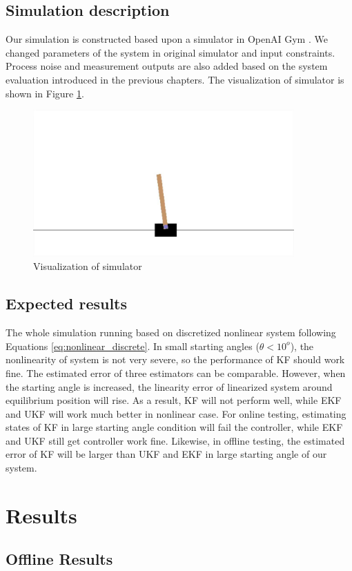 \documentclass{article}
\begin{document}
\subsection{Simulation description}
Our simulation is constructed based upon a simulator in OpenAI Gym \cite{OpenAI}. We changed parameters of the system in original simulator and input constraints. Process noise and measurement outputs are also added based on the system evaluation introduced in the previous chapters. The visualization of simulator is shown in Figure \ref{fig:simulator}.
\begin{figure}[h!]
	\centering
	\includegraphics[width=10cm,keepaspectratio]{Simulator.jpg}
	\caption{Visualization of simulator}
	\label{fig:simulator}
\end{figure}
\subsection{Expected results}
The whole simulation running based on discretized nonlinear system following Equations \ref{eq:nonlinear_discrete}. In small starting angles ($\theta<10^o$), the nonlinearity of system is not very severe, so the performance of KF should work fine. The estimated error of three estimators can be comparable. However, when the starting angle is increased, the linearity error of linearized system around equilibrium position will rise. As a result, KF will not perform well, while EKF and UKF will work much better in nonlinear case. For online testing, estimating states of KF in large starting angle condition will fail the controller, while EKF and UKF still get controller work fine. Likewise, in offline testing, the estimated error of KF will be larger than UKF and EKF in large starting angle of our system.
\section{Results}
\subsection{Offline Results}
\end{document}
